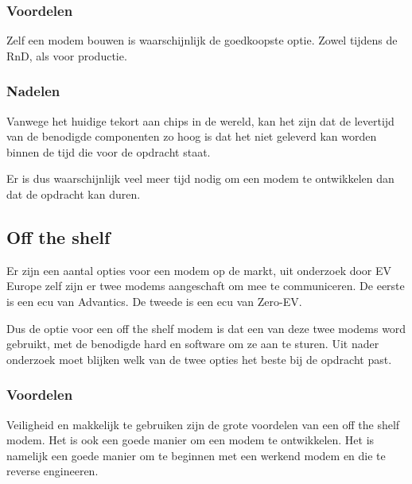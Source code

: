 \subsubsection{Voordelen}

Zelf een modem bouwen is waarschijnlijk de goedkoopste optie. Zowel tijdens de
RnD, als voor productie.

\subsubsection{Nadelen}

Vanwege het huidige tekort aan chips in de wereld, kan het zijn dat de
levertijd van de benodigde componenten zo hoog is dat het niet geleverd
kan worden binnen de tijd die voor de opdracht staat. 

Er is dus waarschijnlijk veel meer tijd nodig om een modem te ontwikkelen dan
dat de opdracht kan duren.

\subsection{Off the shelf}

Er zijn een aantal opties voor een modem op de markt, uit onderzoek door EV
Europe zelf zijn er twee modems aangeschaft om mee te communiceren. De eerste
is een \ac{ecu} van Advantics. De tweede is een \ac{ecu} van Zero-EV.

Dus de optie voor een off the shelf modem is dat een van deze twee modems word
gebruikt, met de benodigde hard en software om ze aan te sturen. Uit nader
onderzoek moet blijken welk van de twee opties het beste bij de opdracht past.

\subsubsection{Voordelen}

Veiligheid en makkelijk te gebruiken zijn de grote voordelen van een off the
shelf modem. Het is ook een goede manier om een modem te ontwikkelen. Het is
namelijk een goede manier om te beginnen met een werkend modem en die te reverse
engineeren.

